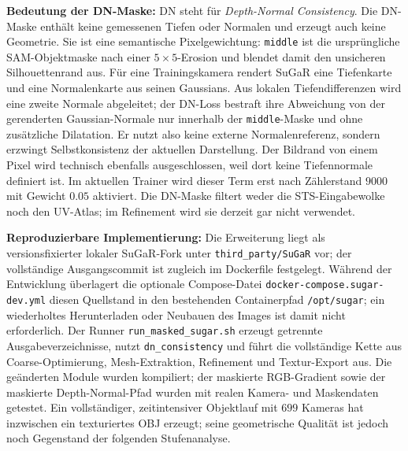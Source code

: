 \documentclass[12pt,a4paper]{article}
\begin{document}
\textbf{Bedeutung der DN-Maske:} DN steht für \emph{Depth-Normal Consistency}. Die DN-Maske enthält keine gemessenen Tiefen oder Normalen und erzeugt auch keine Geometrie. Sie ist eine semantische Pixelgewichtung: \texttt{middle} ist die ursprüngliche SAM-Objektmaske nach einer $5 \times 5$-Erosion und blendet damit den unsicheren Silhouettenrand aus. Für eine Trainingskamera rendert SuGaR eine Tiefenkarte und eine Normalenkarte aus seinen Gaussians. Aus lokalen Tiefendifferenzen wird eine zweite Normale abgeleitet; der DN-Loss bestraft ihre Abweichung von der gerenderten Gaussian-Normale nur innerhalb der \texttt{middle}-Maske und ohne zusätzliche Dilatation. Er nutzt also keine externe Normalenreferenz, sondern erzwingt Selbstkonsistenz der aktuellen Darstellung. Der Bildrand von einem Pixel wird technisch ebenfalls ausgeschlossen, weil dort keine Tiefennormale definiert ist. Im aktuellen Trainer wird dieser Term erst nach Zählerstand $9000$ mit Gewicht $0.05$ aktiviert. Die DN-Maske filtert weder die STS-Eingabewolke noch den UV-Atlas; im Refinement wird sie derzeit gar nicht verwendet.

\textbf{Reproduzierbare Implementierung:} Die Erweiterung liegt als versionsfixierter lokaler SuGaR-Fork unter \texttt{third\_party/SuGaR} vor; der vollständige Ausgangscommit ist zugleich im Dockerfile festgelegt. Während der Entwicklung überlagert die optionale Compose-Datei \texttt{docker-compose.sugar-dev.yml} diesen Quellstand in den bestehenden Containerpfad \texttt{/opt/sugar}; ein wiederholtes Herunterladen oder Neubauen des Images ist damit nicht erforderlich. Der Runner \texttt{run\_masked\_sugar.sh} erzeugt getrennte Ausgabeverzeichnisse, nutzt \texttt{dn\_consistency} und führt die vollständige Kette aus Coarse-Optimierung, Mesh-Extraktion, Refinement und Textur-Export aus. Die geänderten Module wurden kompiliert; der maskierte RGB-Gradient sowie der maskierte Depth-Normal-Pfad wurden mit realen Kamera- und Maskendaten getestet. Ein vollständiger, zeitintensiver Objektlauf mit $699$ Kameras hat inzwischen ein texturiertes OBJ erzeugt; seine geometrische Qualität ist jedoch noch Gegenstand der folgenden Stufenanalyse.
\end{document}
